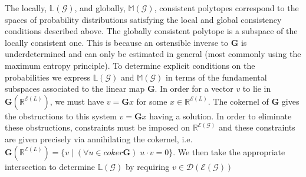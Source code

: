 
The locally, $\mathbb{L}(\mathcal{G})$, and globally, $\mathbb{M}(\mathcal{G})$, consistent polytopes correspond to the spaces of probability distributions satisfying the local and global consistency conditions described above. The globally consistent polytope is a subspace of the locally consistent one. This is because an ostensible inverse to $\mathbf{G}$ is underdetermined and can only be estimated in general (most commonly using the maximum entropy principle).
To determine explicit conditions on the probabilities we express $\mathbb{L}(\mathcal{G})$ and $\mathbb{M}(\mathcal{G})$ in terms of the fundamental subspaces associated to the linear map $\mathbf{G}$. In order for a vector $v$ to lie in $\mathbf{G}(\mathbb{R}^{\mathcal{E}(L)})$, we must have $v=\mathbf{G}x$ for some $x \in \mathbb{R}^{\mathcal{E}(L)}$.  The cokernel of $\mathbf{G}$ gives the obstructions to this system $v=\mathbf{G}x$ having a solution. In order to eliminate these obstructions, constraints must be imposed on $\mathbb{R}^{\mathcal{E}(\mathcal{G})}$ and these constraints are given precisely via annihilating the cokernel, i.e. $\mathbf{G}(\mathbb{R}^{\mathcal{E}(L)}) = \{ v \; | \; (\forall u \in coker \mathbf{G}) \; u \cdot v = 0\}$.  We then take the appropriate intersection to determine $\mathbb{L}(\mathcal{G})$ by requiring $v \in \mathcal{D}(\mathcal{E}(\mathcal{G}))$
